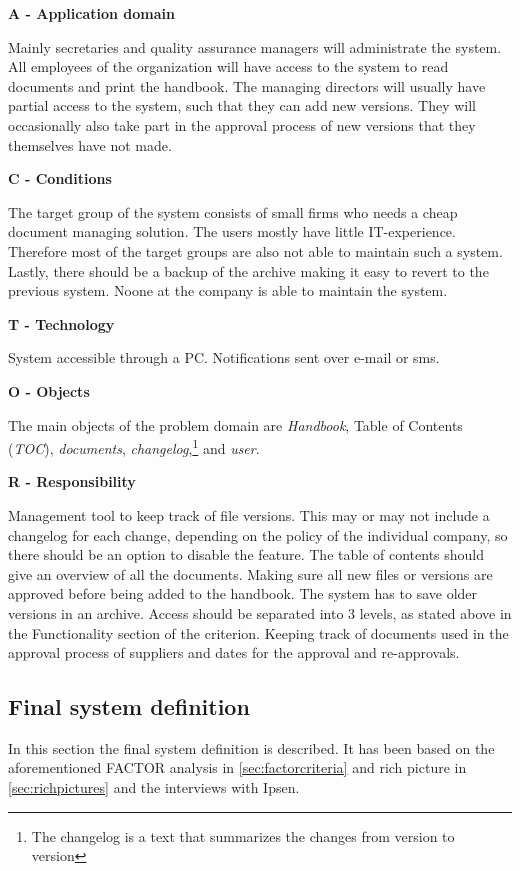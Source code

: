 \textbf{A - Application domain}

Mainly secretaries and quality assurance managers will administrate the system.
All employees of the organization will have access to the system to read documents and print the handbook.
The managing directors will usually have partial access to the system, such that they can add new versions.
They will occasionally also take part in the approval process of new versions that they themselves have not made.

\textbf{C - Conditions} \label{sec:conditions}

The target group of the system consists of small firms who needs a cheap document managing solution.
The users mostly have little IT-experience.
Therefore most of the target groups are also not able to maintain such a system.
Lastly, there should be a backup of the archive making it easy to revert to the previous system.
Noone at the company is able to maintain the system.

\textbf{T - Technology}

System accessible through a PC.
Notifications sent over e-mail or sms.

\textbf{O - Objects}

The main objects of the problem domain are \textit{Handbook}, Table of Contents (\textit{TOC}), \textit{documents}, \textit{changelog},\footnote{The changelog is a text that summarizes the changes from version to version} and \textit{user}.

\textbf{R  - Responsibility}

Management tool to keep track of file versions. This may or may not include a changelog for each change, depending on the policy of the individual company, so there should be an option to disable the feature.
The table of contents should give an overview of all the documents.
Making sure all new files or versions are approved before being added to the handbook.
The system has to save older versions in an archive.
Access should be separated into 3 levels, as stated above in the Functionality section of the criterion.
Keeping track of documents used in the approval process of suppliers and dates for the approval and re-approvals.

\subsection{Final system definition}\label{sec:systemdefinition}
In this section the final system definition is described.
It has been based on the aforementioned FACTOR analysis in \cref{sec:factorcriteria} and rich picture in \cref{sec:richpictures} and the interviews with Ipsen.

